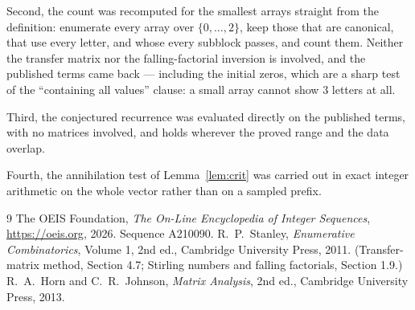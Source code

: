 \documentclass[11pt,a4paper]{article}
\theoremstyle{plain}
\theoremstyle{definition}
\begin{document}
Second, the count was recomputed for the smallest arrays straight from the definition:
enumerate every array over $\{0,\dots,2\}$, keep those that are canonical, that use every
letter, and whose every subblock passes, and count them. Neither the transfer matrix nor the
falling-factorial inversion is involved, and the published terms came back --- including the
initial zeros, which are a sharp test of the ``containing all values'' clause: a small array
cannot show $3$ letters at all.

Third, the conjectured recurrence was evaluated directly on the published terms, with no
matrices involved, and holds wherever the proved range and the data overlap.

Fourth, the annihilation test of Lemma~\ref{lem:crit} was carried out in exact integer
arithmetic on the whole vector rather than on a sampled prefix.

\begin{thebibliography}{9}
 The OEIS Foundation, \emph{The On-Line Encyclopedia of Integer
Sequences}, \url{https://oeis.org}, 2026. Sequence A210090.
 R.~P.~Stanley, \emph{Enumerative Combinatorics}, Volume 1, 2nd ed.,
Cambridge University Press, 2011. (Transfer-matrix method, Section 4.7; Stirling numbers and
falling factorials, Section 1.9.)
 R.~A.~Horn and C.~R.~Johnson, \emph{Matrix Analysis}, 2nd ed., Cambridge
University Press, 2013.
\end{thebibliography}
\end{document}
